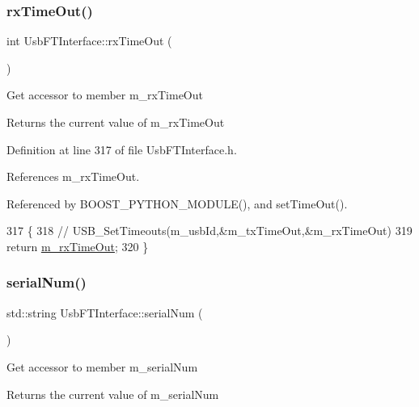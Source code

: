 \subsubsection{\texorpdfstring{rx\+Time\+Out()}{rxTimeOut()}}
{\footnotesize\ttfamily int Usb\+F\+T\+Interface\+::rx\+Time\+Out (\begin{DoxyParamCaption}{ }\end{DoxyParamCaption})\hspace{0.3cm}{\ttfamily [inline]}}

Get accessor to member m\+\_\+rx\+Time\+Out \begin{DoxyReturn}{Returns}
the current value of m\+\_\+rx\+Time\+Out 
\end{DoxyReturn}


Definition at line 317 of file Usb\+F\+T\+Interface.\+h.



References m\+\_\+rx\+Time\+Out.



Referenced by B\+O\+O\+S\+T\+\_\+\+P\+Y\+T\+H\+O\+N\+\_\+\+M\+O\+D\+U\+L\+E(), and set\+Time\+Out().


\begin{DoxyCode}
317                    \{
318     \textcolor{comment}{//    USB\_SetTimeouts(m\_usbId,&m\_txTimeOut,&m\_rxTimeOut)}
319     \textcolor{keywordflow}{return} \hyperlink{classUsbFTInterface_a0153d99857eaa634e4b9fc1ec58caf52}{m\_rxTimeOut};
320   \}
\end{DoxyCode}
\mbox{\label{classUsbFTInterface_ab4a2aa9664e903c57ae396faf643e7a3}} 
\subsubsection{\texorpdfstring{serial\+Num()}{serialNum()}}
{\footnotesize\ttfamily std\+::string Usb\+F\+T\+Interface\+::serial\+Num (\begin{DoxyParamCaption}{ }\end{DoxyParamCaption})\hspace{0.3cm}{\ttfamily [inline]}}

Get accessor to member m\+\_\+serial\+Num \begin{DoxyReturn}{Returns}
the current value of m\+\_\+serial\+Num 
\end{DoxyReturn}


